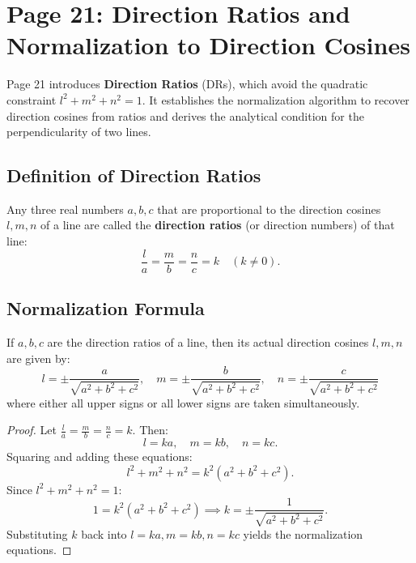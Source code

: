 \section{Page 21: Direction Ratios and Normalization to Direction Cosines}
\label{sec:page21}

\begin{conceptbox}
Page 21 introduces \textbf{Direction Ratios} (DRs), which avoid the quadratic constraint $l^2+m^2+n^2=1$. It establishes the normalization algorithm to recover direction cosines from ratios and derives the analytical condition for the perpendicularity of two lines.
\end{conceptbox}

\subsection{Definition of Direction Ratios}
\begin{conceptbox}
Any three real numbers $a, b, c$ that are proportional to the direction cosines $l, m, n$ of a line are called the \textbf{direction ratios} (or direction numbers) of that line:
\begin{equation}
    \frac{l}{a} = \frac{m}{b} = \frac{n}{c} = k \quad (k \neq 0).
\end{equation}
\end{conceptbox}

\subsection{Normalization Formula}
\begin{theorembox}
If $a, b, c$ are the direction ratios of a line, then its actual direction cosines $l, m, n$ are given by:
\begin{equation}
    \boxed{l = \pm \frac{a}{\sqrt{a^2 + b^2 + c^2}}, \quad m = \pm \frac{b}{\sqrt{a^2 + b^2 + c^2}}, \quad n = \pm \frac{c}{\sqrt{a^2 + b^2 + c^2}}}
\end{equation}
where either all upper signs or all lower signs are taken simultaneously.
\end{theorembox}

\begin{proof}
Let $\frac{l}{a} = \frac{m}{b} = \frac{n}{c} = k$. Then:
\begin{equation}
    l = ka, \quad m = kb, \quad n = kc.
\end{equation}
Squaring and adding these equations:
\begin{equation}
    l^2 + m^2 + n^2 = k^2(a^2 + b^2 + c^2).
\end{equation}
Since $l^2 + m^2 + n^2 = 1$:
\begin{equation}
    1 = k^2(a^2 + b^2 + c^2) \implies k = \pm \frac{1}{\sqrt{a^2 + b^2 + c^2}}.
\end{equation}
Substituting $k$ back into $l = ka, m = kb, n = kc$ yields the normalization equations.
\end{proof}

